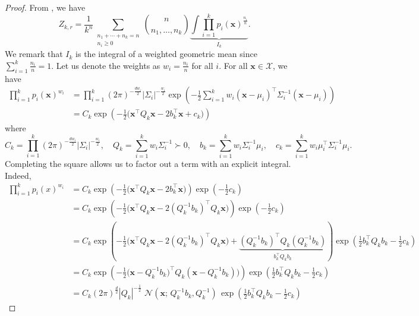 \documentclass[10pt,a4paper]{amsart}
\newcommand{\vx}{\mathbf{x}}
\begin{document}
\begin{proof}
From , we have
\begin{equation}\label{eq: from lemma d}
Z_{k,r} = \frac{1}{k^n}\sum_{\substack{n_1+\cdots+n_k=n \\ n_i \ge 0}} 
\binom{n}{n_1,\dots,n_k}
\underbrace{\int \prod_{i=1}^k p_i(\vx)^{\frac{n_i}{n}}}_{I_k}.
\end{equation}
We remark that $I_k$ is the integral of a weighted geometric mean since $\sum_{i=1}^k \frac{n_i}{n} = 1$. Let us denote the weights as $w_i = \frac{n_i}{n}$ for all $i$. For all 
$\vx \in \mathcal{X}$, we have
\begin{align}
\prod_{i=1}^k p_i(\vx)^{w_i} & = \prod_{i=1}^k (2\pi)^{-\frac{dw_i}{2}}| \Sigma_i |^{-\frac{w_i}{2}} \exp \left(-\frac{1}{2} \sum_{i=1}^k w_i (\vx - \mu_i)^\top \Sigma_i^{-1} (\vx - \mu_i)\right) \label{eq: weighted geometric mean first expression} \\
& = C_k\exp \left( -\frac{1}{2} \big( \vx^\top Q_k \vx - 2 b_k^\top \vx + c_k \big)\right)
\end{align}
where
\begin{equation}\label{eq: intermediate quantities}
C_k = \prod_{i=1}^k (2\pi)^{-\frac{dw_i}{2}}| \Sigma_i |^{-\frac{w_i}{2}}, \quad Q_k = \sum_{i=1}^k w_i \Sigma_i^{-1} \succ 0, \quad b_k = \sum_{i=1}^k w_i \Sigma_i^{-1} \mu_i, \quad c_k = \sum_{i=1}^k w_i \mu_i^\top \Sigma_i^{-1} \mu_i.
\end{equation}
Completing the square allows us to factor out a term with an explicit integral. Indeed,
\begin{align}
\prod_{i=1}^k p_i(x)^{w_i} & =  C_k \exp \left( -\frac{1}{2} \big( \vx^\top Q_k \vx - 2 b_k^\top \vx \big) \right) \exp\left( -\frac{1}{2} c_k \right)\\
& =  C_k \exp \left( -\frac{1}{2} \big( \vx^\top Q_k \vx - 2 (Q_k^{-1} b_k )^\top Q_k \vx \big) \right) \exp\left( -\frac{1}{2} c_k \right) \label{eq: Q symmetric} \\
& =  C_k \exp \left( -\frac{1}{2} \big( \vx^\top Q_k \vx - 2 (Q_k^{-1} b_k )^\top Q_k \vx \big) + \underbrace{(Q_k^{-1} b_k)^\top Q_k (Q_k^{-1} b_k)}_{b_k^\top Q_k b_k} \right) \exp\left( \frac{1}{2} b_k^\top Q_k b_k -\frac{1}{2} c_k \right)\\& = C_k \exp \left( -\frac{1}{2} \big( \vx - Q_k^{-1}b_k)^\top Q_k (\vx - Q_k^{-1}b_k)\big)\right) \exp\left( \frac{1}{2} b_k^\top Q_k b_k -\frac{1}{2} c_k \right)\\
& = C_k (2 \pi)^{\frac{d}{2}} | Q_k |^{-\frac{1}{2}} \,\, \mathcal{N}(\vx; \, Q_k^{-1}b_k, Q_k^{-1}) \, \exp\left( \frac{1}{2} b_k^\top Q_k b_k -\frac{1}{2} c_k \right)

\end{align}
\end{proof}
\end{document}
